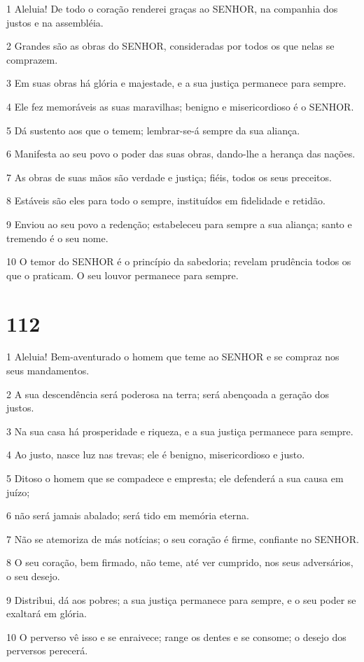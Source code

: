 \par 1 Aleluia! De todo o coração renderei graças ao SENHOR, na companhia dos justos e na assembléia.
\par 2 Grandes são as obras do SENHOR, consideradas por todos os que nelas se comprazem.
\par 3 Em suas obras há glória e majestade, e a sua justiça permanece para sempre.
\par 4 Ele fez memoráveis as suas maravilhas; benigno e misericordioso é o SENHOR.
\par 5 Dá sustento aos que o temem; lembrar-se-á sempre da sua aliança.
\par 6 Manifesta ao seu povo o poder das suas obras, dando-lhe a herança das nações.
\par 7 As obras de suas mãos são verdade e justiça; fiéis, todos os seus preceitos.
\par 8 Estáveis são eles para todo o sempre, instituídos em fidelidade e retidão.
\par 9 Enviou ao seu povo a redenção; estabeleceu para sempre a sua aliança; santo e tremendo é o seu nome.
\par 10 O temor do SENHOR é o princípio da sabedoria; revelam prudência todos os que o praticam. O seu louvor permanece para sempre.

\chapter{112}

\par 1 Aleluia! Bem-aventurado o homem que teme ao SENHOR e se compraz nos seus mandamentos.
\par 2 A sua descendência será poderosa na terra; será abençoada a geração dos justos.
\par 3 Na sua casa há prosperidade e riqueza, e a sua justiça permanece para sempre.
\par 4 Ao justo, nasce luz nas trevas; ele é benigno, misericordioso e justo.
\par 5 Ditoso o homem que se compadece e empresta; ele defenderá a sua causa em juízo;
\par 6 não será jamais abalado; será tido em memória eterna.
\par 7 Não se atemoriza de más notícias; o seu coração é firme, confiante no SENHOR.
\par 8 O seu coração, bem firmado, não teme, até ver cumprido, nos seus adversários, o seu desejo.
\par 9 Distribui, dá aos pobres; a sua justiça permanece para sempre, e o seu poder se exaltará em glória.
\par 10 O perverso vê isso e se enraivece; range os dentes e se consome; o desejo dos perversos perecerá.

